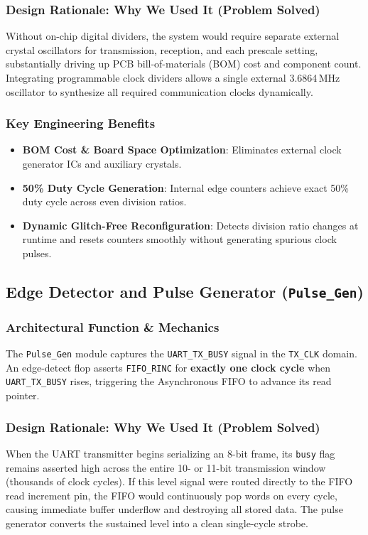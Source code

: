 \documentclass[11pt,a4paper]{article}
\begin{document}
\subsubsection{Design Rationale: Why We Used It (Problem Solved)}
Without on-chip digital dividers, the system would require separate external crystal oscillators for transmission, reception, and each prescale setting, substantially driving up PCB bill-of-materials (BOM) cost and component count. Integrating programmable clock dividers allows a single external 3.6864\,MHz oscillator to synthesize all required communication clocks dynamically.

\subsubsection{Key Engineering Benefits}
\begin{itemize}
    \item \textbf{BOM Cost \& Board Space Optimization}: Eliminates external clock generator ICs and auxiliary crystals.
    \item \textbf{50\% Duty Cycle Generation}: Internal edge counters achieve exact 50\% duty cycle across even division ratios.
    \item \textbf{Dynamic Glitch-Free Reconfiguration}: Detects division ratio changes at runtime and resets counters smoothly without generating spurious clock pulses.
\end{itemize}

\subsection{Edge Detector and Pulse Generator (\texttt{Pulse\_Gen})}

\subsubsection{Architectural Function \& Mechanics}
The \texttt{Pulse\_Gen} module captures the \texttt{UART\_TX\_BUSY} signal in the \texttt{TX\_CLK} domain. An edge-detect flop asserts \texttt{FIFO\_RINC} for \textbf{exactly one clock cycle} when \texttt{UART\_TX\_BUSY} rises, triggering the Asynchronous FIFO to advance its read pointer.

\subsubsection{Design Rationale: Why We Used It (Problem Solved)}
When the UART transmitter begins serializing an 8-bit frame, its \texttt{busy} flag remains asserted high across the entire 10- or 11-bit transmission window (thousands of clock cycles). If this level signal were routed directly to the FIFO read increment pin, the FIFO would continuously pop words on every cycle, causing immediate buffer underflow and destroying all stored data. The pulse generator converts the sustained level into a clean single-cycle strobe.
\end{document}

